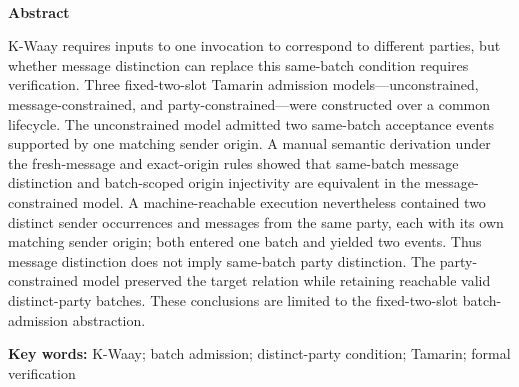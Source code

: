 \begin{abstract}
K-Waay的\batchreceive 要求同次调用中的输入元素分别对应不同参与方，但消息限制能否替代该条件需验证。基于共同生命周期构造无互异、消息互异和参与方互异三种固定两槽Tamarin准入模型。无互异模型允许一个匹配发送来源对应同批两个接受；人工语义推导表明，新鲜消息和精确来源匹配使消息互异性与批内来源单射性等价。机器可达见证显示，同一参与方的不同发送实例与消息各有匹配发送来源，可同批接受，故消息约束不能推出参与方互异性。参与方互异约束模型保持目标关系，有效批次可达。结论限于固定两槽准入抽象。

\noindent\textbf{关键词：}K-Waay；批次准入；批内参与方互异条件；Tamarin；形式化验证
\end{abstract}

\begin{center}
  \large\bfseries \englishtitle\\[0.5em]
  \normalsize Abstract
\end{center}
\noindent
K-Waay requires inputs to one \batchreceive invocation to correspond to
different parties, but whether message distinction can replace this same-batch
condition requires verification.  Three fixed-two-slot Tamarin admission
models---unconstrained, message-constrained, and party-constrained---were
constructed over a common lifecycle.  The unconstrained model admitted two
same-batch acceptance events supported by one matching sender origin.  A
manual semantic derivation under the fresh-message and exact-origin rules
showed that same-batch message distinction and batch-scoped origin injectivity
are equivalent in the message-constrained model.  A machine-reachable
execution nevertheless contained two distinct sender occurrences and messages
from the same party, each with its own matching sender origin; both entered one
batch and yielded two \receiveraccept events.  Thus message distinction does
not imply same-batch party distinction.  The party-constrained model preserved
the target relation while retaining reachable valid distinct-party batches.
These conclusions are limited to the fixed-two-slot batch-admission abstraction.

\noindent\textbf{Key words:} K-Waay; batch admission; distinct-party
condition; Tamarin; formal verification

